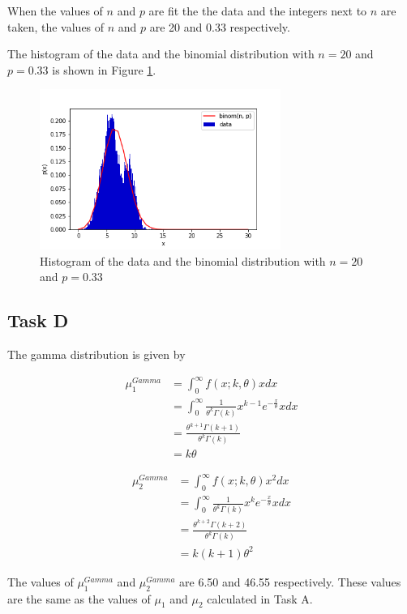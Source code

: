 When the values of $n$ and $p$ are fit the the data and the integers next to $n$ are taken, the values of $n$ and $p$ are 20 and 0.33 respectively.

The histogram of the data and the binomial distribution with $n=20$ and $p=0.33$ is shown in Figure \ref{fig:q3_hist_bin}.

\begin{figure}[H]
    \centering
    \includegraphics[width=0.7\textwidth]{images/3c.png}
    \caption{Histogram of the data and the binomial distribution with $n=20$ and $p=0.33$}
    \label{fig:q3_hist_bin}
\end{figure}

\subsection{Task D}

The gamma distribution is given by

\begin{align*}
    \mu_1^{Gamma} &= \int_0^\infty f(x;k,\theta)xdx \\
    &= \int_0^\infty \frac{1}{\theta^k \Gamma(k)} x^{k-1} e^{-\frac{x}{\theta}}xdx \\
    &= \frac{\theta^{k+1}\Gamma(k+1)}{\theta^k\Gamma(k)} \\
    &= k\theta 
\end{align*}

\begin{align*}
    \mu_2^{Gamma} &= \int_0^\infty f(x;k,\theta)x^2dx \\
    &= \int_0^\infty \frac{1}{\theta^k \Gamma(k)} x^{k} e^{-\frac{x}{\theta}}xdx \\
    &= \frac{\theta^{k+2}\Gamma(k+2)}{\theta^k\Gamma(k)} \\
    &= k(k+1)\theta^2
\end{align*}

The values of $\mu_1^{Gamma}$ and $\mu_2^{Gamma}$ are 6.50 and 46.55 respectively. These values are the same as the values of $\mu_1$ and $\mu_2$ calculated in Task A.

